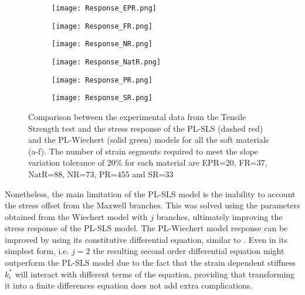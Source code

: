 \begin{figure}[htb!]
	\centering
    \begin{subfigure}[b]{0.49\textwidth}
        \centering
        \texttt{[image: Response\_EPR.png]}
        \caption{}
        \label{fig:ResponseEPR}
    \end{subfigure}
    \begin{subfigure}[b]{0.49\textwidth}
        \centering
        \texttt{[image: Response\_FR.png]}
        \caption{}
        \label{fig:ResponseFR}
    \end{subfigure}
    \begin{subfigure}[b]{0.49\textwidth}
        \centering
        \texttt{[image: Response\_NR.png]}
        \caption{}
        \label{fig:ResponseNR}
    \end{subfigure}
    \begin{subfigure}[b]{0.49\textwidth}
        \centering
        \texttt{[image: Response\_NatR.png]}
        \caption{}
        \label{fig:ResponseNatR}
    \end{subfigure}  
    \begin{subfigure}[b]{0.49\textwidth}
        \centering
        \texttt{[image: Response\_PR.png]}
        \caption{}
        \label{fig:ResponsePR}
    \end{subfigure}  
    \begin{subfigure}[b]{0.49\textwidth}
        \centering
        \texttt{[image: Response\_SR.png]}
        \caption{}
        \label{fig:ResponseSR}
    \end{subfigure}  
    \caption{Comparison between the experimental data from the Tensile Strength test and the stress response of the PL-SLS (dashed red) and the PL-Wiechert (solid green) models for all the soft materials (a-f). The number of strain segments required to meet the slope variation tolerance of 20\% for each material are EPR=20, FR=37, NatR=88, NR=73, PR=455 and SR=33 \cite{solis2018assessment}}
    \label{fig:ResponseAll}
\end{figure}

Nonetheless, the main limitation of the PL-SLS model is the inability to account the stress offset from the Maxwell branches. This was solved using the parameters obtained from the Wiechert model with $j$ branches, ultimately improving the stress response of the PL-SLS model. The PL-Wiechert model response can be improved by using its constitutive differential equation, similar to . Even in its simplest form, i.e. $j=2$ the resulting second order differential equation might outperform the PL-SLS model due to the fact that the strain dependent stiffness $k_i^*$ will interact with different terms of the equation, providing that transforming it into a finite differences equation does not add extra complications.

